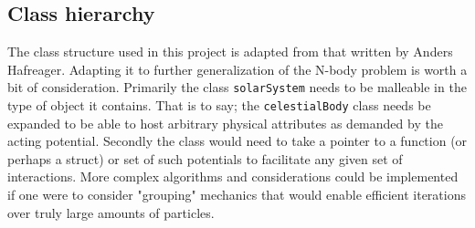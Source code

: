 \subsection{Class hierarchy}

The class structure used in this project is adapted from that written by Anders Hafreager. Adapting it to further generalization of the N-body problem is worth a bit of consideration. Primarily the class \lstinline{solarSystem} needs to be malleable  in the type of object it contains. That is to say; the \lstinline{celestialBody} class needs be expanded to be able to host arbitrary physical attributes as demanded by the acting potential. Secondly the class would need to take a pointer to a function (or perhaps a struct) or set of such potentials to facilitate any given set of interactions. More complex algorithms and considerations could be implemented if one were to consider "grouping" mechanics that would enable efficient iterations over truly large amounts of particles.
